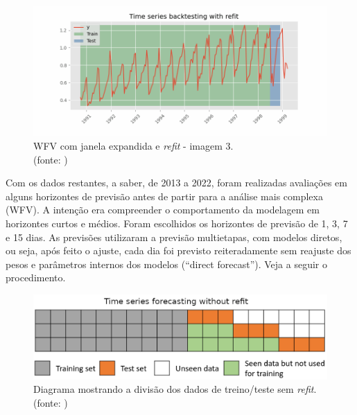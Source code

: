 \begin{figure}[!h]
	\centering
	\includegraphics[scale=0.3]{Figuras/imagem3_skforecast-backtesting-refit.png}
	\caption{WFV com janela expandida e \textit{refit} - imagem 3.\\(fonte: \cite{skforecast})}
	\label{fig:imagem3_skforecast-backtesting-refit}
\end{figure}

Com os dados restantes, a saber, de 2013 a 2022, foram realizadas avaliações em alguns horizontes de previsão antes de partir para a análise mais complexa (WFV). A intenção era compreender o comportamento da modelagem em horizontes curtos e médios. Foram escolhidos os horizontes de previsão de 1, 3, 7 e 15 dias. As previsões utilizaram a previsão multietapas, com modelos diretos, ou seja, após feito o ajuste, cada dia foi previsto reiteradamente sem reajuste dos pesos e parâmetros internos dos modelos (``direct forecast''). Veja a seguir o procedimento.

\begin{figure}[!h]
	\centering
	\includegraphics[scale=0.3]{Figuras/skforecast-diagram-backtesting-no-refit.png}
	\caption{Diagrama mostrando a divisão dos dados de treino/teste sem \textit{refit}.\\(fonte: \cite{skforecast})}
	\label{fig:skforecast-diagram-backtesting-no-refit}
\end{figure}

